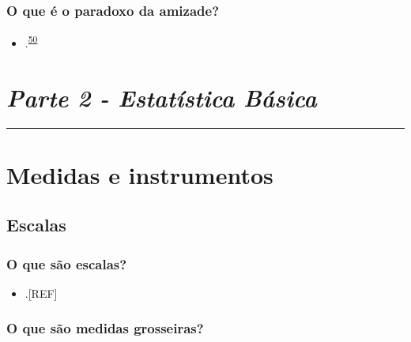 \documentclass[
  a4paper,
]{book}
\providecommand{\tightlist}{%
  \setlength{\itemsep}{0pt}\setlength{\parskip}{0pt}}
\begin{document}
\hypertarget{amizade}{%
\subsection{O que é o paradoxo da amizade?}\label{amizade}}

\begin{itemize}
\tightlist
\item
  .\textsuperscript{\protect\hyperlink{ref-feld1991}{50}}
\end{itemize}


\hypertarget{parte-2---estatuxedstica-buxe1sica}{%
\chapter*{\texorpdfstring{\emph{Parte 2 - Estatística Básica}}{Parte 2 - Estatística Básica}}\label{parte-2---estatuxedstica-buxe1sica}}

\markboth{}{}
\par\noindent\rule{\textwidth}{0.05in}

\hypertarget{medidas-instrumentos}{%
\chapter{\texorpdfstring{\textbf{Medidas e instrumentos}}{Medidas e instrumentos}}\label{medidas-instrumentos}}

\hypertarget{escalas}{%
\section{Escalas}\label{escalas}}

\hypertarget{o-que-suxe3o-escalas}{%
\subsection{O que são escalas?}\label{o-que-suxe3o-escalas}}

\begin{itemize}
\tightlist
\item
  .{[}REF{]}
\end{itemize}

\hypertarget{o-que-suxe3o-medidas-grosseiras}{%
\subsection{O que são medidas grosseiras?}\label{o-que-suxe3o-medidas-grosseiras}}
\end{document}
